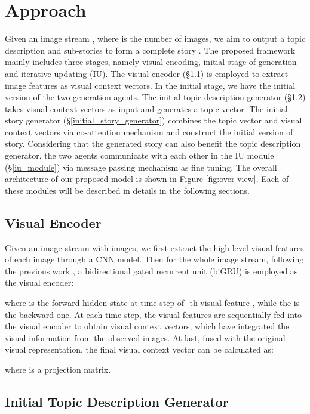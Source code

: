 \documentclass[11pt]{article}
\newcommand{\citep}{\cite}
\begin{document}
\section{Approach}
Given an image stream , where  is the number of images, we aim to output a topic description  and  sub-stories to form a complete story . The proposed framework mainly includes three stages, namely visual encoding, initial stage of generation and iterative updating (IU). The visual encoder (\S \ref{visual_encoder}) is employed to extract image features as visual context vectors. In the initial stage, we have the initial version of the two generation agents. The initial topic description generator (\S \ref{initial_topic_generator}) takes visual context vectors as input and generates a topic vector. The initial story generator (\S \ref{initial_story_generator}) combines the topic vector and visual context vectors via co-attention mechanism and construct the initial version of story. Considering that the generated story can also benefit the topic description generator, the two agents communicate with each other in the IU module (\S \ref{iu_module}) via message passing mechanism as fine tuning. The overall architecture of our proposed model is shown in Figure \ref{fig:over-view}. 
Each of these modules will be described in details in the following sections.

\subsection{Visual Encoder}
\label{visual_encoder}
Given an image stream  with  images, we first extract the high-level visual features  of each image   through a CNN model. Then for the whole image stream, following the previous work \citep{Wang:2018tda}, a bidirectional gated recurrent unit (biGRU) is employed as the visual encoder:

where  is the forward hidden state at time step  of -th visual feature , while the  is the backward one. At each time step, the visual features are sequentially fed into the visual encoder to obtain visual context vectors, which have integrated the visual information from the observed images. 
At last, fused with the original visual representation, the final visual context vector  
can be calculated as:
{
\setlength\abovedisplayskip{1pt}
\setlength\belowdisplayskip{1pt}

}
where  is a projection matrix.\subsection{Initial Topic Description Generator}
\label{initial_topic_generator}
\end{document}
